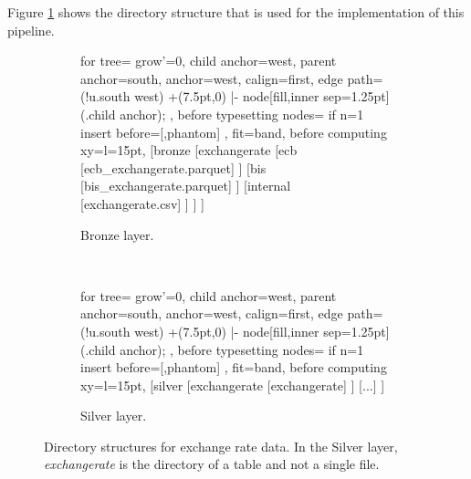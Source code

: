 Figure \ref{fig:dirstruct_exchangerate} shows the directory structure that is used for the implementation of this pipeline.

\begin{figure}[h!]
	\centering
	\begin{subfigure}[t]{.48\textwidth}
		\centering
		\begin{forest}
			for tree={
				grow'=0,
				child anchor=west,
				parent anchor=south,
				anchor=west,
				calign=first,
				edge path={
					\noexpand{}
					(!u.south west) +(7.5pt,0) |- node[fill,inner sep=1.25pt] {} (.child anchor);
				},
				before typesetting nodes={
					if n=1
					{insert before={[,phantom]}}
					{}
				},
				fit=band,
				before computing xy={l=15pt},
			}
			[bronze
			[exchangerate
			[ecb
			[ecb\_exchangerate.parquet]
			]
			[bis
			[bis\_exchangerate.parquet]
			]
			[internal
			[exchangerate.csv]
			]
			]
			]
		\end{forest}
		\caption{Bronze layer.}
	\end{subfigure} %
	~
	\begin{subfigure}[t]{.48\textwidth}
		\centering
		\begin{forest}
			for tree={
				grow'=0,
				child anchor=west,
				parent anchor=south,
				anchor=west,
				calign=first,
				edge path={
					\noexpand{}
					(!u.south west) +(7.5pt,0) |- node[fill,inner sep=1.25pt] {} (.child anchor)\forestoption{edge label};
				},
				before typesetting nodes={
					if n=1
					{insert before={[,phantom]}}
					{}
				},
				fit=band,
				before computing xy={l=15pt},
			}
			[silver
			[exchangerate
			[exchangerate]
			]
			[...]
			]
		\end{forest}
		\caption{Silver layer.}
	\end{subfigure}
	\caption{Directory structures for exchange rate data. In the Silver layer, \emph{exchangerate} is the directory of a table and not a single file.\label{fig:dirstruct_exchangerate}}
\end{figure}

